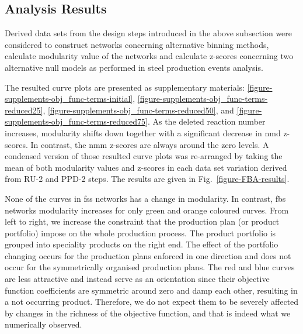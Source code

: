 \subsection{Analysis Results}
Derived data sets from the design steps introduced in the above subsection were considered to construct networks concerning alternative binning methods, calculate modularity value of the networks and calculate z-scores concerning two alternative null models as performed in steel production events analysis.

The resulted curve plots are presented as supplementary materials: \ref{figure-supplements-obj_func-terms-initial}, \ref{figure-supplements-obj_func-terms-reduced25}, \ref{figure-supplements-obj_func-terms-reduced50}, and \ref{figure-supplements-obj_func-terms-reduced75}. As the deleted reaction number increases, modularity shifts down together with a significant decrease in \acs{nmd} z-scores. In contrast, the \acs{nmm} z-scores are always around the zero levels. A condensed version of those resulted curve plots was re-arranged by taking the mean of both modularity values and z-scores in each data set variation derived from RU-2 and PPD-2 steps. The results are given in Fig.~\ref{figure-FBA-results}.

None of the curves in \acs{fss} networks has a change in modularity. In contrast, \acs{fbs} networks modularity increases for only green and orange coloured curves. From left to right, we increase the constraint that the production plan (or product portfolio) impose on the whole production process. The product portfolio is grouped into speciality products on the right end. The effect of the portfolio changing occurs for the production plans enforced in one direction and does not occur for the symmetrically organised production plans. The red and blue curves are less attractive and instead serve as an orientation since their objective function coefficients are symmetric around zero and damp each other, resulting in a not occurring product. Therefore, we do not expect them to be severely affected by changes in the richness of the objective function, and that is indeed what we numerically observed.



